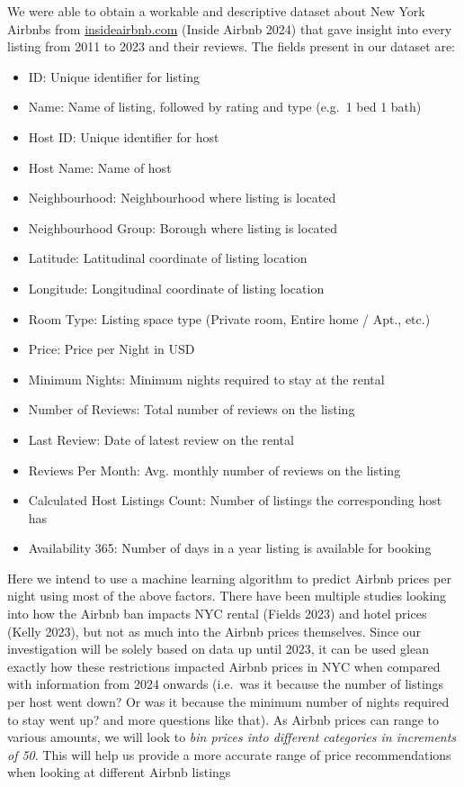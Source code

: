 \documentclass[
  letterpaper,
  DIV=11,
  numbers=noendperiod]{scrartcl}
\providecommand{\tightlist}{%
  \setlength{\itemsep}{0pt}\setlength{\parskip}{0pt}}\usepackage{longtable,booktabs,array}
\begin{document}
We were able to obtain a workable and descriptive dataset about New York
Airbnbs from
\href{http://insideairbnb.com/new-york-city/}{insideairbnb.com} (Inside
Airbnb 2024) that gave insight into every listing from 2011 to 2023 and
their reviews. The fields present in our dataset are:

\begin{itemize}
\tightlist
\item
  ID: Unique identifier for listing
\item
  Name: Name of listing, followed by rating and type (e.g.~1 bed 1 bath)
\item
  Host ID: Unique identifier for host
\item
  Host Name: Name of host
\item
  Neighbourhood: Neighbourhood where listing is located
\item
  Neighbourhood Group: Borough where listing is located
\item
  Latitude: Latitudinal coordinate of listing location
\item
  Longitude: Longitudinal coordinate of listing location
\item
  Room Type: Listing space type (Private room, Entire home / Apt., etc.)
\item
  Price: Price per Night in USD
\item
  Minimum Nights: Minimum nights required to stay at the rental
\item
  Number of Reviews: Total number of reviews on the listing
\item
  Last Review: Date of latest review on the rental
\item
  Reviews Per Month: Avg. monthly number of reviews on the listing
\item
  Calculated Host Listings Count: Number of listings the corresponding
  host has
\item
  Availability 365: Number of days in a year listing is available for
  booking
\end{itemize}

Here we intend to use a machine learning algorithm to predict Airbnb
prices per night using most of the above factors. There have been
multiple studies looking into how the Airbnb ban impacts NYC rental
(Fields 2023) and hotel prices (Kelly 2023), but not as much into the
Airbnb prices themselves. Since our investigation will be solely based
on data up until 2023, it can be used glean exactly how these
restrictions impacted Airbnb prices in NYC when compared with
information from 2024 onwards (i.e.~was it because the number of
listings per host went down? Or was it because the minimum number of
nights required to stay went up? and more questions like that). As
Airbnb prices can range to various amounts, we will look to \emph{bin
prices into different categories in increments of 50}. This will help us
provide a more accurate range of price recommendations when looking at
different Airbnb listings
\end{document}
